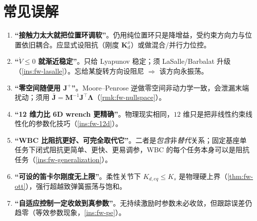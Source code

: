 \section*{常见误解}
\begin{enumerate}
  \item \textbf{“接触力太大就把位置环调软”}。仍用纯位置环只是降增益，受约束方向力与位置依旧耦合。应显式设阻抗（刚度 $\mathbf{K}_d^x$）或做混合/并行力位控。
  \item \textbf{“$\dot V\le0$ 就渐近稳定”}。只给 Lyapunov 稳定；须 LaSalle/Barbalat 升级（\cref{ins:fw-lasalle}）。忘给某旋转方向设阻尼 $\Rightarrow$ 该方向永振荡。
  \item \textbf{“零空间随便用 $\mathbf{J}^+$”}。Moore--Penrose 逆做零空间非动力学一致，会泄漏末端扰动；须用 $\bar{\mathbf{J}}=\mathbf{M}^{-1}\mathbf{J}^\top\boldsymbol{\Lambda}$（\cref{rmk:fw-nullspace}）。
  \item \textbf{“12 维力比 6D wrench 更精确”}。物理现实相同，$12$ 维只是把非线性约束线性化的参数化技巧（\cref{ins:fw-12d}）。
  \item \textbf{“WBC 比阻抗更好、可完全取代它”}。二者是\emph{包含}非\emph{替代}关系；固定基座单任务下闭式阻抗更简单、更快、更易调参，WBC 的每个任务本身可以是阻抗任务（\cref{ins:fw-generalization}）。
  \item \textbf{“可设的笛卡尔刚度无上限”}。柔性关节下 $K_{d,eq}\le K_s$ 是物理硬上界（\cref{thm:fw-ott}），强行超越致弹簧振荡与饱和。
  \item \textbf{“自适应控制一定收敛到真参数”}。无持续激励时参数未必收敛，但跟踪误差仍趋零（等效参数现象，\cref{ins:fw-pe}）。
\end{enumerate}


